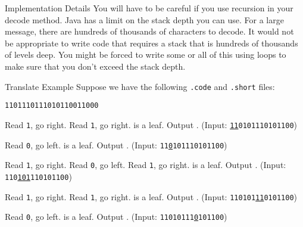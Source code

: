 \documentclass[programming]{../../mfcs}
\begin{document}
\begin{question}{Implementation Details}
You will have to be careful if you use recursion in your decode method.  Java has a limit on
the stack depth you can use.  For a large message, there are hundreds of thousands of
characters to decode.  It would not be appropriate to write code that requires a stack that
is hundreds of thousands of levels deep.  You might be forced to write some or all of this
using loops to make sure that you don't exceed the stack depth.
\end{question}

\begin{question}{Translate Example}
Suppose we have the following \texttt{.code} and \texttt{.short} files:\\

\hspace*{3em}
\begin{minipage}{0.4\textwidth}
\end{minipage}
\hfill
\begin{minipage}{0.5\textwidth}
\renewcommand{\FancyVerbFormatLine}[1]{#1}
\begin{Verbatim}[fontsize=\small,frame=single,label=simple-spec-example.short]
1101110111010110011000
\end{Verbatim}
\end{minipage}\hspace*{3em}

\vspace{1em}

Read \texttt{1}, go right. Read \texttt{1}, go right.  is a leaf.  Output .
\hfill (Input: \texttt{\underline{11}0101110101100})

Read \texttt{0}, go left.   is a leaf.  Output .
\hfill (Input: \texttt{11\underline{0}101110101100})

Read \texttt{1}, go right.  Read \texttt{0}, go left.  Read \texttt{1}, go right.  \qquote{ } is a leaf.  Output \qquote{ }.
\hfill (Input: \texttt{110\underline{101}110101100})

Read \texttt{1}, go right. Read \texttt{1}, go right.  is a leaf.  Output .
\hfill (Input: \texttt{110101\underline{11}0101100})

Read \texttt{0}, go left.   is a leaf.  Output .
\hfill (Input: \texttt{11010111\underline{0}101100})


\end{question}
\end{document}
